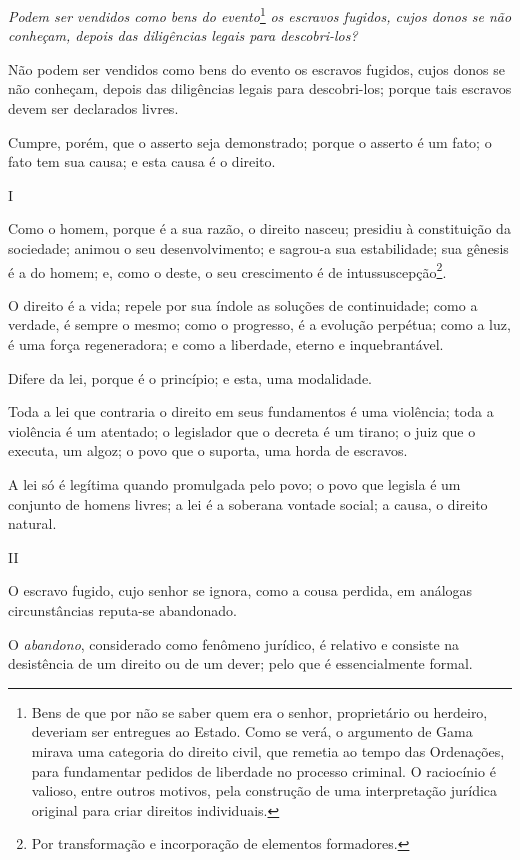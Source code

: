 \emph{Podem ser vendidos como bens do evento}\footnote{Bens de que por
  não se saber quem era o senhor, proprietário ou herdeiro, deveriam ser
  entregues ao Estado. Como se verá, o argumento de Gama mirava uma
  categoria do direito civil, que remetia ao tempo das Ordenações, para
  fundamentar pedidos de liberdade no processo criminal. O raciocínio é
  valioso, entre outros motivos, pela construção de uma interpretação
  jurídica original para criar direitos individuais.} \emph{os escravos
fugidos, cujos donos se não conheçam, depois das diligências legais para
descobri-los?}

Não podem ser vendidos como bens do evento os escravos fugidos, cujos
donos se não conheçam, depois das diligências legais para descobri-los;
porque tais escravos devem ser declarados livres.

Cumpre, porém, que o asserto seja demonstrado; porque o asserto é um
fato; o fato tem sua causa; e esta causa é o direito.

I

Como o homem, porque é a sua razão, o direito nasceu; presidiu à
constituição da sociedade; animou o seu desenvolvimento; e sagrou-a sua
estabilidade; sua gênesis é a do homem; e, como o deste, o seu
crescimento é de intussuscepção\footnote{Por transformação e
  incorporação de elementos formadores.}.

O direito é a vida; repele por sua índole as soluções de continuidade;
como a verdade, é sempre o mesmo; como o progresso, é a evolução
perpétua; como a luz, é uma força regeneradora; e como a liberdade,
eterno e inquebrantável.

Difere da lei, porque é o princípio; e esta, uma modalidade.

Toda a lei que contraria o direito em seus fundamentos é uma violência;
toda a violência é um atentado; o legislador que o decreta é um tirano;
o juiz que o executa, um algoz; o povo que o suporta, uma horda de
escravos.

A lei só é legítima quando promulgada pelo povo; o povo que legisla é um
conjunto de homens livres; a lei é a soberana vontade social; a causa, o
direito natural.

II

O escravo fugido, cujo senhor se ignora, como a cousa perdida, em
análogas circunstâncias reputa-se abandonado.

O \emph{abandono}, considerado como fenômeno jurídico, é relativo e
consiste na desistência de um direito ou de um dever; pelo que é
essencialmente formal.

